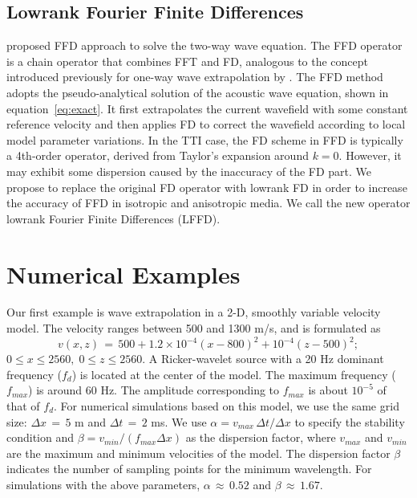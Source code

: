 {\subsection{Lowrank Fourier Finite Differences}
\cite{songx} proposed FFD approach to solve the two-way wave equation. 
The FFD operator is a chain operator that combines FFT and FD, analogous to the concept introduced previously for one-way wave extrapolation by \cite{ffd}.
The FFD method adopts the pseudo-analytical solution of the acoustic wave equation, shown in equation~\ref{eq:exact}.
It first extrapolates the current wavefield with some constant reference velocity 
and then applies FD to correct the wavefield according to local model parameter variations.  
In the TTI case, the FD scheme in FFD is typically a 4th-order operator, derived from Taylor's expansion around $k=0$. 
However, it may exhibit some dispersion caused by the inaccuracy of the FD part. 
We propose to replace the original FD operator with lowrank FD in order to increase the accuracy of FFD in isotropic and anisotropic media.
We call the new operator lowrank Fourier Finite Differences (LFFD). 

\section{Numerical Examples}


Our first example is wave extrapolation in a 2-D, smoothly variable velocity model. The velocity ranges between 500 and 1300 m/s, and is formulated as 
\begin{equation}
v(x,z)\,=\,500+1.2\times10^{-4}(x-800)^2+10^{-4}(z-500)^2;
\end{equation}
$0\le x\le2560,\;0\le z\le2560.$
A Ricker-wavelet source with a 20 Hz dominant frequency ($f_{d}$) is located at the center of the model. 
The maximum frequency ($f_{max}$) is around 60 Hz.  
The amplitude corresponding to $f_{max}$ is about $10^{-5}$ of that of $f_{d}$.
For numerical simulations based on this model, we use the same grid size: $\Delta x\,=\,5$ m and $\Delta t\,=\,2$ ms.
We use $\alpha=v_{max}\,\Delta t/\Delta x$ to specify the stability condition and $\beta=v_{min}/(f_{max}\Delta x)$ as the dispersion factor, where $v_{max}$ and $v_{min}$ are the maximum and minimum velocities of the model.
The dispersion factor $\beta$ indicates the number of sampling points 
for the minimum wavelength. 
For simulations with the above parameters, $\alpha\,\approx\,0.52$ and
$\beta \,\approx\, 1.67$.


}
